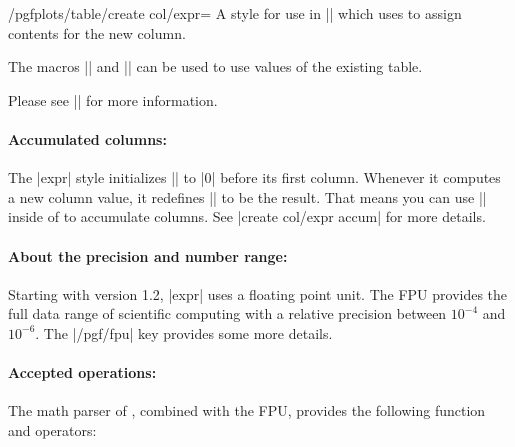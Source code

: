 \documentclass[a4paper]{ltxdoc}
\begin{document}
\begin{stylekey}{/pgfplots/table/create col/expr=}
    A style for use in |\pgfplotstablecreatecol| which uses  to assign contents for the new column.
\begin{codeexample}[]

\end{codeexample}
    The macros |\thisrow| and |\nextrow| can be
    used to use values of the existing table.

    Please see |\pgfplotstablecreatecol| for more information.


    \paragraph{Accumulated columns:}

    The |expr| style initializes |\pgfmathaccuma| to |0| before its first
    column. Whenever it computes a new column value, it redefines
    |\pgfmathaccuma| to be the result. That means you can use |\pgfmathaccuma|
    inside of  to accumulate columns. See
    |create col/expr accum| for more details.


    \paragraph{About the precision and number range:}

    Starting with version 1.2, |expr| uses a floating point unit. The FPU
    provides the full data range of scientific computing with a relative
    precision between $10^{-4}$ and $10^{-6}$. The |/pgf/fpu| key provides some
    more details.


    \paragraph{Accepted operations:}

    The math parser of \PGF, combined with the FPU, provides the following
    function and operators:


\end{stylekey}
\end{document}
